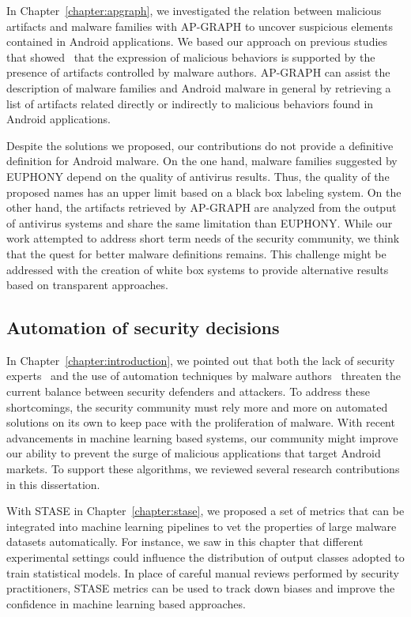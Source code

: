 In Chapter~\ref{chapter:apgraph}, we investigated the relation between malicious artifacts and malware families with AP-GRAPH to uncover suspicious elements contained in Android applications.
We based our approach on previous studies that showed~\cite{allix_forensic_2014,li_understanding_2017} that the expression of malicious behaviors is supported by the presence of artifacts controlled by malware authors.
AP-GRAPH can assist the description of malware families and Android malware in general by retrieving a list of artifacts related directly or indirectly to malicious behaviors found in Android applications.

Despite the solutions we proposed, our contributions do not provide a definitive definition for Android malware.
On the one hand, malware families suggested by EUPHONY depend on the quality of antivirus results.
Thus, the quality of the proposed names has an upper limit based on a black box labeling system.
On the other hand, the artifacts retrieved by AP-GRAPH are analyzed from the output of antivirus systems and share the same limitation than EUPHONY.
While our work attempted to address short term needs of the security community, we think that the quest for better malware definitions remains.
This challenge might be addressed with the creation of white box systems to provide alternative results based on transparent approaches.
\subsection{Automation of security decisions}
In Chapter~\ref{chapter:introduction}, we pointed out that both the lack of security experts~\cite{ics2_cybersecurity_2018} and the use of automation techniques by malware authors~\cite{av-test_malware_2019} threaten the current balance between security defenders and attackers.
To address these shortcomings, the security community must rely more and more on automated solutions on its own to keep pace with the proliferation of malware.
With recent advancements in machine learning based systems, our community might improve our ability to prevent the surge of malicious applications that target Android markets.
To support these algorithms, we reviewed several research contributions in this dissertation.

With STASE in Chapter~\ref{chapter:stase}, we proposed a set of metrics that can be integrated into machine learning pipelines to vet the properties of large malware datasets automatically.
For instance, we saw in this chapter that different experimental settings could influence the distribution of output classes adopted to train statistical models.
In place of careful manual reviews performed by security practitioners, STASE metrics can be used to track down biases and improve the confidence in machine learning based approaches.

